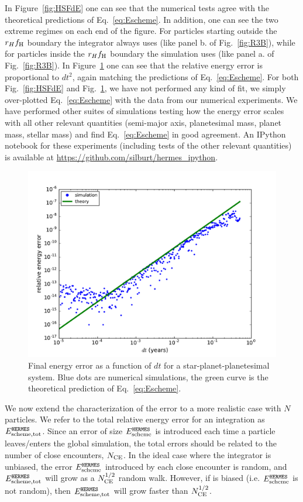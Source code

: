 In Figure~\ref{fig:HSFdE} one can see that the numerical tests agree with the theoretical predictions of Eq.~\ref{eq:Escheme}.
In addition, one can see the two extreme regimes on each end of the figure.
For particles starting outside the $r_Hf_{\rm H}$ boundary the integrator always uses \whfast (like panel b. of Fig.~\ref{fig:R3B}), while for particles inside the $r_H f_{\rm H}$ boundary the simulation uses \ias (like panel a. of Fig.~\ref{fig:R3B}).
In Figure~\ref{fig:dtdE} one can see that the relative energy error is proportional to $dt^2$, again matching the predictions of Eq.~\ref{eq:Escheme}.
For both Fig.~\ref{fig:HSFdE} and Fig.~\ref{fig:dtdE}, we have not performed any kind of fit, we simply over-plotted Eq.~\ref{eq:Escheme} with the data from our numerical experiments. 
We have performed other suites of simulations testing how the energy error scales with all other relevant quantities (semi-major axis, planetesimal mass, planet mass, stellar mass) and find Eq.~\ref{eq:Escheme} in good agreement.
An IPython notebook for these experiments (including tests of the other relevant quantities) is available at \url{https://github.com/silburt/hermes_ipython}.

\begin{figure}
\centerline{\includegraphics[scale=0.45]{chap4/images/dt_v_dE.pdf}}
\caption{Final energy error as a function of $dt$ for a star-planet-planetesimal system. 
Blue dots are numerical simulations, the green curve is the theoretical prediction of Eq.~\ref{eq:Escheme}.
 }
\label{fig:dtdE}
\end{figure}

We now extend the characterization of the error to a more realistic case with $N$ particles.
We refer to the total relative energy error for an integration as $E_{\rm scheme,tot}^{{\sc \tt HERMES}}$.
Since an error of size $E_{\rm scheme}^{{\sc \tt HERMES}}$ is introduced each time a particle leaves/enters the global simulation, the total errors should be related to the number of close encounters, $N_{\rm CE}$.
In the ideal case where the integrator is unbiased, the error $E_{\rm scheme}^{{\sc \tt HERMES}}$ introduced by each close encounter is random, and $E_{\rm scheme,tot}^{{\sc \tt HERMES}}$ will grow as a $N_{\rm CE}^{1/2}$ random walk.
However, if \hermes is biased (i.e. $E_{\rm scheme}^{{\sc \tt HERMES}}$ is not random), then $E_{\rm scheme,tot}^{{\sc \tt HERMES}}$ will grow faster than $N_{\rm CE}^{1/2}$. 

